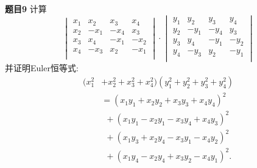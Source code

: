 \documentclass[aspectratio=43]{beamer}
\begin{document}
\begin{frame}{\textbf{题目9}}
	计算\begin{equation*}
	\begin{vmatrix}
	x_1 &  x_2 &  x_3 &  x_4\\
	x_2 & -x_1 & -x_4 &  x_3\\
	x_3 &  x_4 & -x_1 & -x_2\\
	x_4 & -x_3 &  x_2 & -x_1\\
	\end{vmatrix}\cdot\begin{vmatrix}
	y_1 &  y_2 &  y_3 &  y_4\\
	y_2 & -y_1 & -y_4 &  y_3\\
	y_3 &  y_4 & -y_1 & -y_2\\
	y_4 & -y_3 &  y_2 & -y_1\\
	\end{vmatrix}
	\end{equation*}
	并证明Euler恒等式:\begin{equation*}
	\begin{split}
	(x_1^2&+x_2^2+x_3^2+x_4^2)(y_1^2+y_2^2+y_3^2+y_4^2)\\
	&=(x_1y_1+x_2y_2+x_3y_3+x_4y_4)^2\\
	&~~+(x_1y_1-x_2y_1-x_3y_4+x_4y_3)^2\\
	&~~+(x_1y_3+x_2y_4-x_3y_1-x_4y_2)^2\\
	&~~+(x_1y_4-x_2y_4+x_3y_2-x_4y_1)^2.
	\end{split}
	\end{equation*}
\end{frame}
\end{document}
